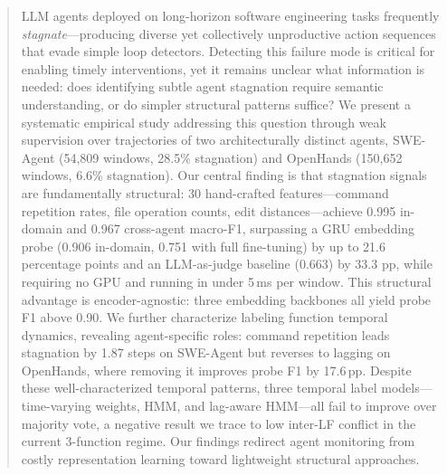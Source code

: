 \begin{abstract}
LLM agents deployed on long-horizon software engineering tasks frequently \emph{stagnate}---producing diverse yet collectively unproductive action sequences that evade simple loop detectors.
Detecting this failure mode is critical for enabling timely interventions, yet it remains unclear what information is needed: does identifying subtle agent stagnation require semantic understanding, or do simpler structural patterns suffice?
We present a systematic empirical study addressing this question through weak supervision over trajectories of two architecturally distinct agents, SWE-Agent (54,809 windows, 28.5\% stagnation) and OpenHands (150,652 windows, 6.6\% stagnation).
Our central finding is that stagnation signals are fundamentally structural: 30 hand-crafted features---command repetition rates, file operation counts, edit distances---achieve 0.995 in-domain and 0.967 cross-agent macro-F1, surpassing a GRU embedding probe (0.906 in-domain, 0.751 with full fine-tuning) by up to 21.6 percentage points and an LLM-as-judge baseline (0.663) by 33.3 pp, while requiring no GPU and running in under 5\,ms per window.
This structural advantage is encoder-agnostic: three embedding backbones all yield probe F1 above 0.90.
We further characterize labeling function temporal dynamics, revealing agent-specific roles: command repetition leads stagnation by 1.87 steps on SWE-Agent but reverses to lagging on OpenHands, where removing it improves probe F1 by 17.6\,pp.
Despite these well-characterized temporal patterns, three temporal label models---time-varying weights, HMM, and lag-aware HMM---all fail to improve over majority vote, a negative result we trace to low inter-LF conflict in the current 3-function regime.
Our findings redirect agent monitoring from costly representation learning toward lightweight structural approaches.
\end{abstract}
